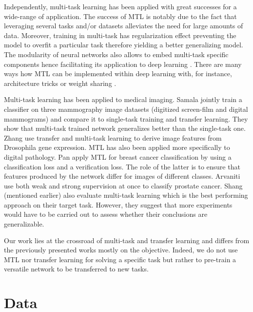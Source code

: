 Independently, multi-task learning \parencite{zhang2017survey} has been applied with great successes for a wide-range of application. The success of MTL is notably due to the fact that leveraging several tasks and/or datasets alleviates the need for large amounts of data. Moreover, training in multi-task has regularization effect preventing the model to overfit a particular task therefore yielding a better generalizing model. The modularity of neural networks also allows to embed multi-task specific components hence facilitating its application to deep learning \parencite{caruana1997multitask, zhang2017survey}. There are many ways how MTL can be implemented within deep learning with, for instance, architecture tricks \parencite{misra2016cross, strezoski2019many} or weight sharing \parencite{caruana1997multitask}. 

Multi-task learning has been applied to medical imaging. Samala \etal \parencite{samala2017multi} jointly train a classifier on three mammography image datasets (digitized screen-film and digital mammograms) and compare it to single-task training and transfer learning. They show that multi-task trained network generalizes better than the single-task one. Zhang \etal \parencite{zhang2016deep} use transfer and multi-task learning to derive image features from Drosophila gene expression. MTL has also been applied more specifically to digital pathology. Pan \etal \parencite{pan2018multi} apply MTL for breast cancer classification by using a classification loss and a verification loss. The role of the latter is to ensure that features produced by the network differ for images of different classes. Arvaniti \etal \parencite{arvaniti2018coupling} use both weak and strong supervision at once to classify prostate cancer. Shang \etal (mentioned earlier) also evaluate multi-task learning which is the best performing approach on their target task. However, they suggest that more experiments would have to be carried out to assess whether their conclusions are generalizable.

Our work lies at the crossroad of multi-task and transfer learning and differs from the previously presented works mostly on the objective. Indeed, we do not use MTL nor transfer learning for solving a specific task but rather to pre-train a versatile network to be transferred to new tasks. 

\section{Data}
\label{sec:mtask:data}


